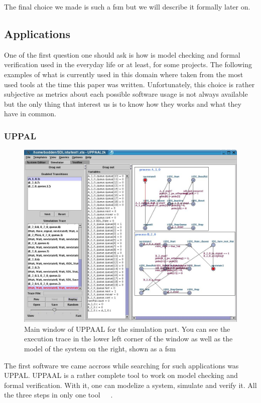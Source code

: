 \documentclass[12pt]{article}
\begin{document}
The final choice we made is such a \gls{fsm} but we will describe it formally later on.

\subsection{Applications}

One of the first question one should ask is how is model checking and formal verification used in the everyday life or at least, for some projects. The following examples of what is currently used in this domain where taken from the most used tools at the time this paper was written. Unfortunately, this choice is rather subjective as metrics about each possible software usage is not always available but the only thing that interest us is to know how they works and what they have in common.

\subsubsection{UPPAL}

\begin{figure}
    \centering
    \includegraphics[scale=0.3]{UPPAAL_trace.jpg}
    \caption{Main window of UPPAAL for the simulation part. You can see the execution trace in the lower left corner of the window as well as the model of the system on the right, shown as a \gls{fsm}}
    \label{UPPAAL}
\end{figure}

The first software we came accross while searching for such applications was UPPAL. UPPAAL is a rather complete tool to work on model checking and formal verification. With it, one can modelize a system, simulate and verify it. All the three steps in only one tool~\cite{Bengtsson1996}~\cite{Behrmann2004}~\cite{Larsen1997}.\\
\end{document}
